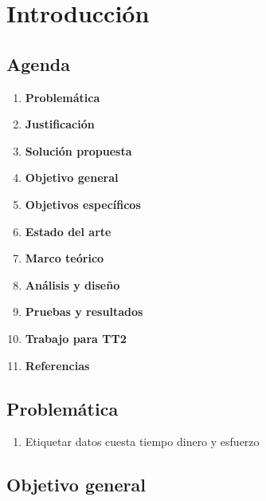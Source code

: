 \chapter{Introducción}



\section{Agenda}

\begin{multicols}{2}

	\begin{enumerate}

		\item \textbf{Problemática}
		\item \textbf{Justificación}
		\item \textbf{Solución propuesta}
		\item \textbf{Objetivo general}
		\item \textbf{Objetivos específicos}
		\item \textbf{Estado del arte}
		\item \textbf{Marco teórico}
		\item \textbf{Análisis y diseño}
		\item \textbf{Pruebas y resultados}
		\item \textbf{Trabajo para TT2}
		\item \textbf{Referencias}

	\end{enumerate}

\end{multicols}


\section{Problemática}

\begin{enumerate}
	
	\item Etiquetar datos cuesta tiempo dinero y esfuerzo
	
\end{enumerate}

\section{Objetivo general}

